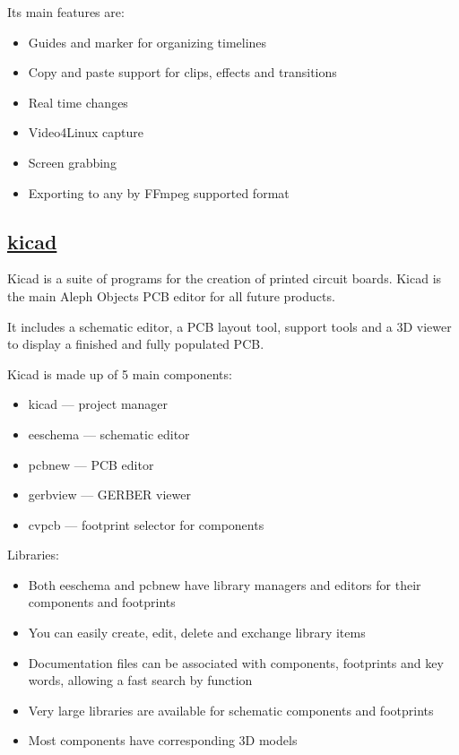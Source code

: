  Its main features are:

\begin{itemize}
 \item Guides and marker for organizing timelines
 \item Copy and paste support for clips, effects and transitions
 \item Real time changes
 \item Video4Linux capture
 \item Screen grabbing
 \item Exporting to any by FFmpeg supported format
\end{itemize}

\subsection{\href{http://www.kicad-pcb.org}{kicad}}

Kicad is a suite of programs for the creation of printed circuit boards.
Kicad is the main Aleph Objects PCB editor for all future products.

 It includes a schematic editor, a PCB layout tool, support tools and a
 3D viewer to display a finished and fully populated PCB.
 
 Kicad is made up of 5 main components:

\begin{itemize}
 \item  kicad --- project manager
 \item  eeschema --- schematic editor
 \item  pcbnew --- PCB editor
 \item  gerbview --- GERBER viewer
 \item  cvpcb --- footprint selector for components
\end{itemize}
 
 Libraries:

\begin{itemize}
 \item Both eeschema and pcbnew have library managers and editors for their
    components and footprints
 \item You can easily create, edit, delete and exchange library items
 \item Documentation files can be associated with components, footprints and key
    words, allowing a fast search by function
 \item Very large libraries are available for schematic components and footprints
 \item Most components have corresponding 3D models
\end{itemize}

